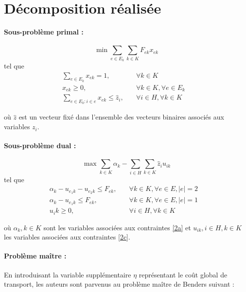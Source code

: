\section{Décomposition réalisée}

\paragraph{Sous-problème primal :}

\[ \min \sum_{e \in E_k}\sum_{k \in K}F_{ek}x_{ek}\]
tel que
\begin{subequations}
    \begin{align}
        \sum_{e \in E_k}x_{ek} = 1, \quad &\forall{k\in K} \label{2a} &\\
        x_{ek} \ge 0, \quad &\forall{k \in K}, \forall{e \in E_k} \label{2b}&\\
        \sum_{e \in E_k:i\in e}x_{ek} \le \hat{z}_i,\quad &\forall{i \in H}, \forall{k\in K}\label{2c}
    \end{align}
\end{subequations}

où $\hat{z}$ est un vecteur fixé dans l'ensemble des vecteurs binaires associés aux variables $z_i$.

\smallskip

\paragraph{Sous-problème dual : } 

\[ \max \sum_{k \in K}\alpha_k - \sum_{i \in H}\sum_{k \in K} \hat{z}_iu_{ik}\]
tel que
\begin{subequations}
    \begin{align}
        \alpha_k - u_{e_1k} - u_{e_2k} \le F_{ek}, \quad &\forall{k\in K}, \forall{e \in E}, |e| = 2&\\
        \alpha_k - u_{e_1k} \le F_{ek}, \quad &\forall{k\in K}, \forall{e \in E}, |e| = 1&\\
        u_ik \ge 0, \quad &\forall{i \in H}, \forall{k \in K}
    \end{align}
\end{subequations}

où $\alpha_k, k\in K$ sont les variables associées aux contraintes \ref{2a} et $u_{ik}, i \in H, k \in K$ les variables associées aux contraintes \ref{2c}.

\smallskip
\paragraph{Problème maître :} En introduisant la variable supplémentaire $\eta$ représentant le coût global de transport, les auteurs sont parvenus au problème maître de Benders suivant : 


